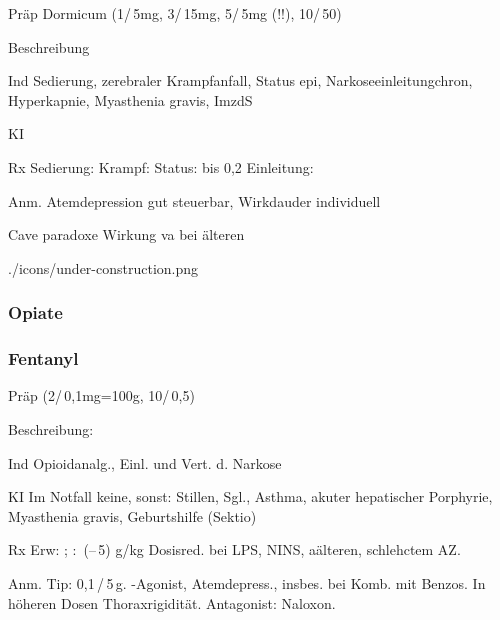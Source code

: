 {
\begin{labeling}[:]{mm}
  \item[Präp] Dormicum (1\Ml*/\,5mg, 3\Ml*/\,15mg, 5\Ml*/\,5mg (!!), 10\Ml*/\,50\Mg*)
  \item[Beschreibung]
  \item[Ind] Sedierung, zerebraler Krampfanfall,
  Status epi, Narkoseeinleitungchron, Hyperkapnie, Myasthenia gravis,
  ImzdS
  \item[KI]
  \item[Rx] Sedierung:  \MgKg\newline
  Krampf: \MgKg\newline
  Status: bis 0,2\MgKg\newline
  Einleitung: \MgKg
  \item[Anm.] Atemdepression gut steuerbar, Wirkdauder individuell
  \item[Cave]  paradoxe Wirkung va bei älteren
\end{labeling}
}
{}
{./icons/under-construction.png}
{}
{}

\subsubsection{Opiate}
\subsubsection{Fentanyl}


\begin{labeling}[:]{mm}
  \item[Präp] (2\Ml*/\,0,1mg=100{\textmu}g, 10\Ml*/\,0,5\Mg*)
  \item[Beschreibung:]
  \item[Ind] Opioidanalg., Einl. und Vert. d. Narkose
  \item[KI] Im Notfall keine, sonst: Stillen, Sgl., Asthma, akuter hepatischer
  Porphyrie, Myasthenia gravis, Geburtshilfe (Sektio)
  \item[Rx] Erw: \Mg; : \,(--\,5)
  {\textmu}g/kg \newline Dosisred. bei LPS, NINS, aälteren, schlehctem AZ.
  \item[Anm.] Tip: 0,1\,\Ml*/\,5\,{\textmu}g. {\textmu}-Agonist, Atemdepress.,
  insbes. bei Komb. mit Benzos. In höheren Dosen Thoraxrigidität. Antagonist:
  Naloxon.
\end{labeling}




